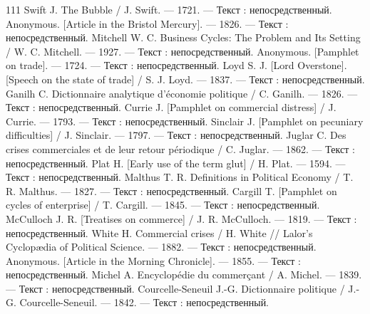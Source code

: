 \begin{RaggedRight}
\begin{thebibliography}{111}
     \hypertarget{bib:Swift-1721}{} Swift J. The Bubble / J. Swift. --- 1721. --- Текст : непосредственный.
     \hypertarget{bib:Anonymous-1826}{} Anonymous. [Article in the Bristol Mercury]. --- 1826. --- Текст : непосредственный.
     \hypertarget{bib:Mitchell-1927}{} Mitchell W. C. Business Cycles: The Problem and Its Setting / W. C. Mitchell. --- 1927. --- Текст : непосредственный.
     \hypertarget{bib:Anonymous-1724}{} Anonymous. [Pamphlet on trade]. --- 1724. --- Текст : непосредственный.
     \hypertarget{bib:Loyd-1837}{} Loyd S. J. [Lord Overstone]. [Speech on the state of trade] / S. J. Loyd. --- 1837. --- Текст : непосредственный.
     \hypertarget{bib:Ganilh-1826}{} Ganilh C. Dictionnaire analytique d’économie politique / C. Ganilh. --- 1826. --- Текст : непосредственный.
     \hypertarget{bib:Currie-1793}{} Currie J. [Pamphlet on commercial distress] / J. Currie. --- 1793. --- Текст : непосредственный.
     \hypertarget{bib:Sinclair-1797}{} Sinclair J. [Pamphlet on pecuniary difficulties] / J. Sinclair. --- 1797. --- Текст : непосредственный.
     \hypertarget{bib:Juglar-1862}{} Juglar C. Des crises commerciales et de leur retour périodique / C. Juglar. --- 1862. --- Текст : непосредственный.
     \hypertarget{bib:Plat-1594}{} Plat H. [Early use of the term \textquotedbl{}glut\textquotedbl{}] / H. Plat. --- 1594. --- Текст : непосредственный.
     \hypertarget{bib:Malthus-1827}{} Malthus T. R. Definitions in Political Economy / T. R. Malthus. --- 1827. --- Текст : непосредственный.
     \hypertarget{bib:Cargill-1845}{} Cargill T. [Pamphlet on cycles of enterprise] / T. Cargill. --- 1845. --- Текст : непосредственный.
     \hypertarget{bib:McCulloch-1819}{} McCulloch J. R. [Treatises on commerce] / J. R. McCulloch. --- 1819. --- Текст : непосредственный.
     \hypertarget{bib:White-1882}{} White H. Commercial crises / H. White // Lalor’s Cyclopædia of Political Science. --- 1882. --- Текст : непосредственный.
     \hypertarget{bib:Anonymous-1855}{} Anonymous. [Article in the Morning Chronicle]. --- 1855. --- Текст : непосредственный.
     \hypertarget{bib:Michel-1839}{} Michel A. Encyclopédie du commerçant / A. Michel. --- 1839. --- Текст : непосредственный.
     \hypertarget{bib:Courcelle-Seneuil-1842}{} Courcelle-Seneuil J.-G. Dictionnaire politique / J.-G. Courcelle-Seneuil. --- 1842. --- Текст : непосредственный.

\end{thebibliography}
\end{RaggedRight}
